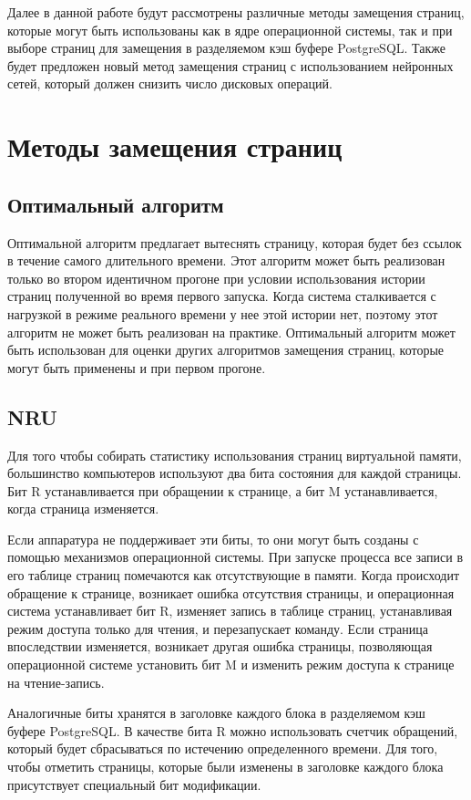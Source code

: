Далее в данной работе будут рассмотрены различные методы замещения страниц, которые могут быть использованы как в ядре операционной системы, так и при выборе страниц для замещения в разделяемом кэш буфере PostgreSQL.
Также будет предложен новый метод замещения страниц с использованием нейронных сетей, который должен снизить число дисковых операций.

\section{Методы замещения страниц}
\subsection{Оптимальный алгоритм}

Оптимальной алгоритм предлагает вытеснять страницу, которая будет без ссылок в течение самого длительного времени.
Этот алгоритм может быть реализован только во втором идентичном прогоне при условии использования истории  страниц полученной во время первого запуска. 
Когда система сталкивается с нагрузкой в режиме реального времени у нее этой истории нет, поэтому этот алгоритм не может быть реализован на практике.
Оптимальный алгоритм может быть использован для оценки других алгоритмов замещения страниц, которые могут быть применены и при первом прогоне.

\subsection{NRU}

Для того чтобы собирать статистику использования страниц виртуальной памяти, большинство компьютеров используют два бита состояния для каждой страницы.
Бит R устанавливается при обращении к странице, а бит M устанавливается, когда страница изменяется.

Если аппаратура не поддерживает эти биты, то они могут быть созданы с помощью механизмов операционной системы.
При запуске процесса все записи в его таблице страниц помечаются как отсутствующие в памяти.
Когда происходит обращение к странице, возникает ошибка отсутствия страницы, и операционная система устанавливает бит R, изменяет запись в таблице страниц, устанавливая режим доступа только для чтения, и перезапускает команду.
Если страница впоследствии изменяется, возникает другая ошибка страницы, позволяющая операционной системе установить бит M и изменить режим доступа к странице на чтение-запись.

Аналогичные биты хранятся в заголовке каждого блока в разделяемом кэш буфере PostgreSQL.
В качестве бита R можно использовать счетчик обращений, который будет сбрасываться по истечению определенного времени.
Для того, чтобы отметить страницы, которые были изменены в заголовке каждого блока присутствует специальный бит модификации.

